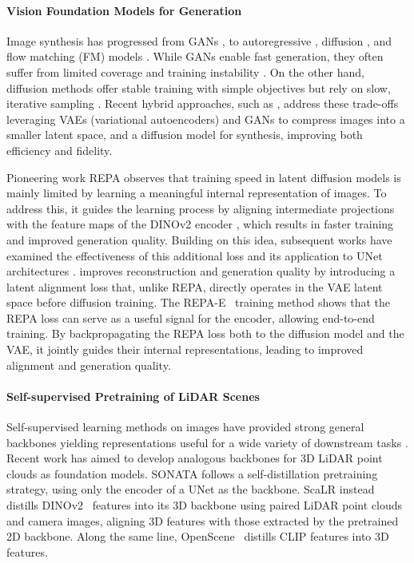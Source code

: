 \paragraph{Vision Foundation Models for Generation} 
Image synthesis has progressed from GANs \cite{goodfellow2014generative}, to autoregressive \cite{van2016conditional}, diffusion \cite{ho_denoising_2020}, and flow matching (FM) models \cite{lipmanflow}. 
While GANs enable fast generation, they often suffer from limited coverage and training instability \cite{brock2018large}.
On the other hand, diffusion methods offer stable training with simple objectives but rely on slow, iterative sampling \cite{song_score-based_2020}.
Recent hybrid approaches, such as \cite{rombach_high-resolution_2022}, address these trade-offs leveraging VAEs (variational autoencoders) and GANs to compress images into a smaller latent space, and a diffusion model for synthesis, improving both efficiency and fidelity.

Pioneering work REPA \cite{yu_representation_2025} observes that training speed in latent diffusion models is mainly limited by learning a meaningful internal representation of images. To address this, it guides the learning process by aligning intermediate projections with the feature maps of the DINOv2 encoder \cite{oquab2024dinov2}, which results in faster training and improved generation quality.
Building on this idea, subsequent works have examined the effectiveness of this additional loss \cite{wang_repa_2025} and its application to UNet architectures \cite{tian_u-repa_2025}.
\cite{yao_reconstruction_2025} improves reconstruction and generation quality by introducing a latent alignment loss that, unlike REPA, directly operates in the VAE latent space before diffusion training.
The REPA-E~\cite{leng_repa-e_2025} training method shows that the REPA loss can serve as a useful signal for the encoder, allowing end-to-end training. By backpropagating the REPA loss both to the diffusion model and the VAE, it jointly guides their internal representations, leading to improved alignment and generation quality.

\paragraph{Self-supervised Pretraining of LiDAR Scenes}
Self-supervised learning methods on images have provided strong general backbones yielding representations useful for a wide variety of downstream tasks \cite{oquab2024dinov2}. 
Recent work has aimed to develop analogous backbones for 3D LiDAR point clouds as foundation models.
SONATA \cite{wu2025sonata} follows a self-distillation pretraining strategy, using only the encoder of a UNet as the backbone.
ScaLR \cite{puy2024three} instead distills DINOv2~\cite{oquab2024dinov2} features into its 3D backbone using paired LiDAR point clouds and camera images, aligning 3D features with those extracted by the pretrained 2D backbone.
Along the same line, OpenScene~\cite{peng2023openscene} distills CLIP features into 3D features. 
